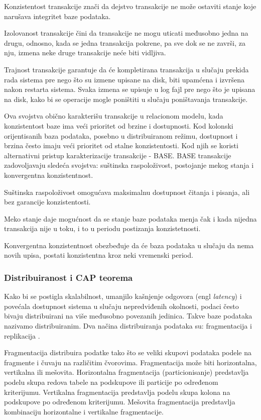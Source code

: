 \documentclass[12pt,oneside]{memoir}
\begin{document}
Konzistentost transakcije znači da dejstvo transakcije ne može ostaviti stanje koje narušava integritet baze podataka.

Izolovanost transakcije čini da transakcije ne mogu uticati međusobno jedna na drugu, odnosno, kada se jedna transakcija pokrene, pa sve dok se ne završi, za nju, izmena neke druge transakcije neće biti vidljiva.

Trajnost transakcije garantuje da će kompletirana transakcija u slučaju prekida rada sistema pre nego što su izmene upisane na disk, biti upamćena i izvršena nakon restarta sistema. Svaka izmena se upisuje u log fajl pre nego što je upisana na disk, kako bi se operacije mogle poništiti u slučaju poništavanja transakcije.

Ova svojstva obično karakterišu transakcije u relacionom modelu, kada konzistentost baze ima veći prioritet od brzine i dostupnosti. Kod kolonski orijentisanih baza podataka, posebno u distribuiranom režimu, dostupnost i brzina često imaju veći prioritet od stalne konzistentosti. Kod njih se koristi alternativni pristup karakterizacije transakcije - BASE. BASE transakcije zadovoljavaju sledeća svojstva: suštinska raspoloživost, postojanje mekog stanja i konvergentna konzistentnost.

Suštinska raspoloživost omogućava maksimalnu dostupnost čitanja i pisanja, ali bez garancije konzistentosti.

Meko stanje daje mogućnost da se stanje baze podataka menja čak i kada nijedna transakcija nije u toku, i to u periodu postizanja konzistetnosti.

Konvergentna konzistentnost obezbeđuje da će baza podataka u slučaju da nema novih upisa, postati konzistentna kroz neki vremenski period. 

\subsubsection{Distribuiranost i CAP teorema}

Kako bi se postigla skalabilnost, umanjilo kašnjenje odgovora (engl \textit{latency}) i povećala dostupnost sistema u slučaju nepredviđenih okolnosti, podaci često bivaju distribuirani na više međusobno povezanih jedinica. Takve baze podataka nazivamo distribuiranim.
Dva načina distribuiranja podataka su: fragmentacija i replikacija \cite{URBP}. 

Fragmentacija distribuira podatke tako što se veliki skupovi podataka podele na fragmente i čuvaju na različitim čvorovima. Fragmentacija može biti horizontalna, vertikalna ili mešovita. Horizontalna fragmentacija (particionisanje) predstavlja podelu skupa redova tabele na podskupove ili particije po određenom kriterijumu. Vertikalna fragmentacija predstavlja podelu skupa kolona na podskupove po određenom kriterijumu.  Mešovita fragmentacija predstavlja kombinaciju horizontalne i vertikalne fragmentacije.
\end{document}
